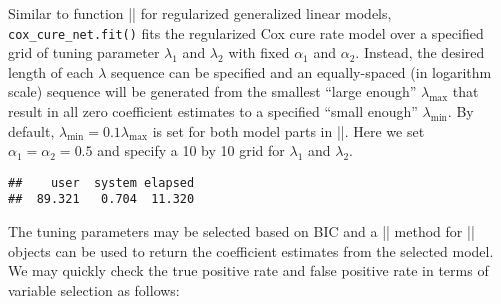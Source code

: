 Similar to function
\VERB|\OperatorTok{::}\NormalTok{()}|
for regularized generalized linear models, \texttt{cox\_cure\_net.fit()}
fits the regularized Cox cure rate model over a specified grid of tuning
parameter \(\lambda_1\) and \(\lambda_2\) with fixed \(\alpha_1\) and
\(\alpha_2\). Instead, the desired length of each \(\lambda\) sequence
can be specified and an equally-spaced (in logarithm scale) sequence
will be generated from the smallest ``large enough'' \(\lambda_{\max}\)
that result in all zero coefficient estimates to a specified ``small
enough'' \(\lambda_{\min}\). By default,
\(\lambda_{\min}=0.1\lambda_{\max}\) is set for both model parts in
\VERB|\NormalTok{()}|. Here we set
\(\alpha_1 = \alpha_2 = 0.5\) and specify a 10 by 10 grid for
\(\lambda_1\) and \(\lambda_2\).

\begin{Shaded}
\begin{Highlighting}[]
\NormalTok{(\{}
\StringTok{ }\NormalTok{(}
        \OperatorTok{$}\OperatorTok{$}
         \NormalTok{, } \NormalTok{,}
         \NormalTok{, } 
\NormalTok{    )}
\NormalTok{\})}
\end{Highlighting}
\end{Shaded}

\begin{verbatim}
##    user  system elapsed 
##  89.321   0.704  11.320
\end{verbatim}

The tuning parameters may be selected based on BIC and a
\VERB|\NormalTok{()}| method for
\VERB|| objects can be used to return the
coefficient estimates from the selected model. We may quickly check the
true positive rate and false positive rate in terms of variable
selection as follows:

